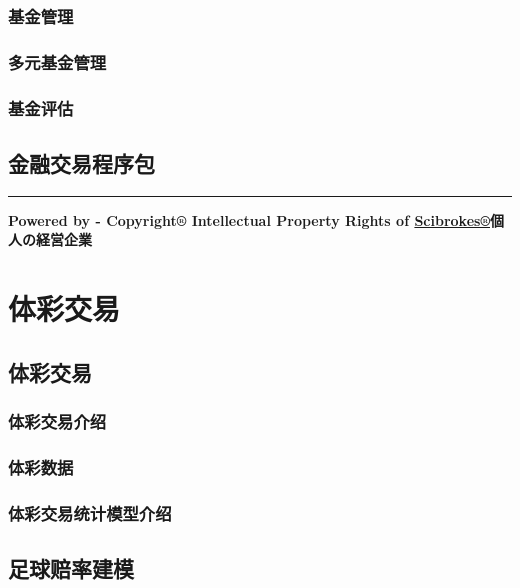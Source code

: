 \documentclass[]{book}
\theoremstyle{definition}
\theoremstyle{definition}
\theoremstyle{definition}
\theoremstyle{remark}
\begin{document}
\subsection{基金管理}

\subsection{多元基金管理}

\subsection{基金评估}

\section{金融交易程序包}

\begin{center}\rule{0.5\linewidth}{\linethickness}\end{center}

\textbf{Powered by - Copyright® Intellectual Property Rights of
\href{http://www.scibrokes.com}{Scibrokes®}個人の経営企業}

\chapter{体彩交易}\label{sportsbook}

\section{体彩交易}

\subsection{体彩交易介绍}

\subsection{体彩数据}

\subsection{体彩交易统计模型介绍}

\section{足球赔率建模}
\end{document}
